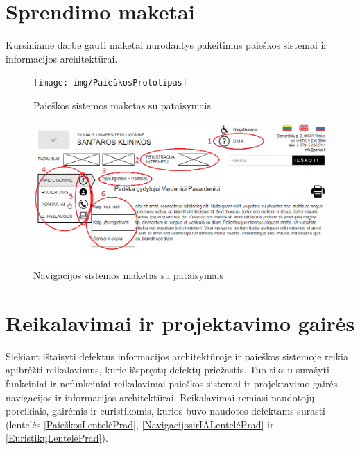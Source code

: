 \documentclass{VUMIFPSbakalaurinis}
\begin{document}
\section{Sprendimo maketai}
Kursiniame darbe gauti maketai nurodantys pakeitimus paieškos sistemai ir informacijos architektūrai.

\begin{figure}[H]
    \centering
    \texttt{[image: img/PaieškosPrototipas]}
    \caption{Paieškos sistemos maketas su pataisymais}
    \label{img:PaieškosPrototipas}
\end{figure}

\begin{figure}[H]
    \centering
    \includegraphics[scale=0.65]{img/NavigacijosPrototipas}
    \caption{Navigacijos sistemos maketas su pataisymais}
    \label{img:NavigacijosPrototipas}
\end{figure}

\section{Reikalavimai ir projektavimo gairės}
Siekiant ištaisyti defektus informacijos architektūroje ir paieškos sistemoje reikia apibrėžti reikalavimus, kurie išspręstų defektų priežastis. Tuo tikslu surašyti funkciniai ir nefunkciniai reikalavimai paieškos sistemai ir projektavimo gairės navigacijos ir informacijos architektūrai. Reikalavimai remiasi naudotojų poreikiais, gairėmis ir euristikomis, kurios buvo naudotos defektams surasti (lentelės \ref{PaieškosLentelėPrad}, \ref{NavigacijosirIALentelėPrad} ir \ref{EuristikųLentelėPrad}).
\end{document}
